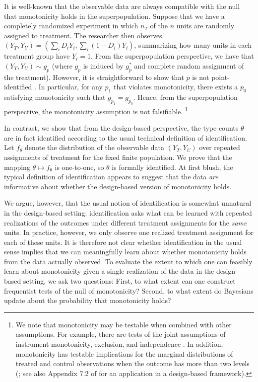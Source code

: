 \documentclass[12pt,reqno]{amsart}
\theoremstyle{theorem}
\theoremstyle{definition}
\newcommand{\0}{\mathbf{0}}
\newcommand{\1}{\mathbf{1}}
\begin{document}
It is well-known that the observable data are always compatible with the null that monotonicity holds in the
superpopulation. Suppose that we have a completely randomized experiment in
which $n_T$ of the $n$ units are randomly assigned to treatment. The researcher then
observes $(Y_T,Y_U) = (\sum_i D_i Y_i, \sum_i (1-D_i) Y_i)$, summarizing how many units in
each treatment group have $Y_i=1$. From the superpopulation perspective,
we have that $(Y_T,Y_U) \sim g_p$ (where $g_p$ is induced by $g_p^*$ and complete random assignment of the treatment). However, it is straightforward to show that
$p$ is not point-identified \citep[see, e.g.,][]{heckman_making_1997, fan_sharp_2010}. In particular, for any $p_1$ that violates monotonicity,
there exists a $p_0$ satisfying monotonicity such that $g_{p_1} = g_{p_0}$. Hence, from
the superpopulation perspective, the monotonicity assumption is not falsifiable.%
\footnote{We note that monotonicity may be testable when combined with other assumptions. For example, there are tests of the joint assumptions of instrument monotonicity, exclusion, and independence \citep[e.g.][]{kitagawa_test_2015}.
In addition, monotonicity has testable implications for the marginal distributions of treated and control observations when the outcome has more than two levels (\citealp{angrist1995two}; see also Appendix 7.2 of \citealp{caughey2023randomisation} for an application in a design-based framework).
}

In contrast, we show that from the design-based perspective, the type counts $\theta$ are in fact identified according to the usual technical definition of identification. Let $f_\theta$ denote the distribution of the observable data $(Y_T,Y_U)$  over repeated assignments of treatment for the fixed finite population. We prove that the mapping $\theta \mapsto f_\theta$ is one-to-one, so $\theta$ is formally identified. At first blush, the typical definition of identification appears to suggest that the data \emph{are} informative about whether the design-based version of monotonicity holds. 

We argue, however, that the usual notion of identification is somewhat unnatural in the
design-based setting: identification asks what can be learned with repeated
realizations of the outcomes under different treatment assignments for the \emph{same}
units. In practice, however, we only observe one realized treatment assignment for each of
these units. It is therefore not clear whether identification in the usual sense implies
that we can meaningfully {learn} about whether monotonicity holds from the data actually observed. To evaluate the extent to which one can feasibly learn about
monotonicity given a single realization of the data in the design-based setting,
we ask two questions: First, to what extent can one construct frequentist tests of the
null of monotonicity? Second, to what extent do Bayesians update about the probability
that monotonicity holds?
\end{document}
